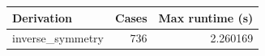 {\small
\begin{tabular}{lrr}
\hline
Derivation & Cases & Max runtime (s) \\
\hline
inverse\_symmetry & 736 & 2.260169 \\
\hline
\end{tabular}
}
